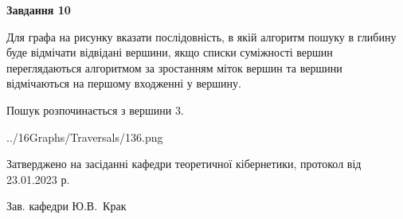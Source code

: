 \documentclass[12pt, ukrainian]{article}
\begin{document}
{\begin {large}
{\begin {center}\textbf{Завдання 10}\end {center}}\par
Для графа на рисунку вказати послідовність, в якій алгоритм пошуку в глибину буде відмічати відвідані вершини, якщо списки суміжності вершин переглядаються алгоритмом за зростанням міток вершин та вершини відмічаються на першому вход\-женні у вершину.\par
Пошук розпочинається з вершини 3.\par

\begin{center}
	{../16Graphs/Traversals/136.png}
\end{center}\par
\newpage


\end {large}
}
{\smallskip \begin {small} Затверджено на засіданні кафедри теоретичної кібернетики, протокол  від   23.01.2023 р.\par\smallskip\smallskip
{\parbox {6.5 cm}{Зав. кафедри \dotfill Ю.В.~Крак}} \end{small}}
\end{document}
